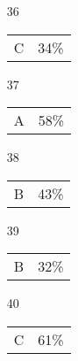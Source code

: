 \documentclass[12pt]{article}
\begin{document}
\begin{multicols}{5}
\begin{enumerate}
\item[]
\item[36] \begin{tabular}{cc} C & 34\%\end{tabular}
\item[37] \begin{tabular}{cc} A & 58\%\end{tabular}
\item[38] \begin{tabular}{cc} B & 43\%\end{tabular}
\item[39] \begin{tabular}{cc} B & 32\%\end{tabular}
\item[40] \begin{tabular}{cc} C & 61\%\end{tabular}

\item[]


\end{enumerate}
\end{multicols}
\end{document}
